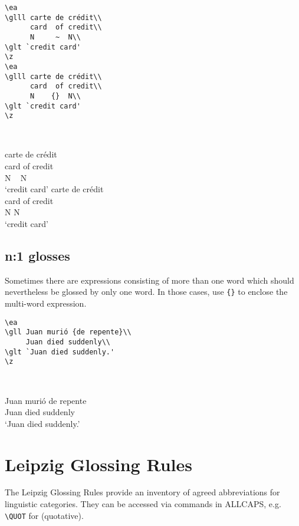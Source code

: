 \documentclass[output=paper]{langscibook}
\newcommand{\cmd}[1]{\texttt{\textbackslash#1}}
\begin{document}
\begin{minipage}[t]{.55\textwidth}
\begin{lstlisting}
\ea
\glll carte de crédit\\ 
      card  of credit\\
      N     ~  N\\
\glt `credit card'     
\z
\ea
\glll carte de crédit\\ 
      card  of credit\\
      N    {}  N\\
\glt `credit card'     
\z
 \end{lstlisting}
\end{minipage}~
\parbox[t]{.45\textwidth}{ 
\ea
\glll carte de crédit\\ 
      card  of credit\\
      N     ~  N\\
\glt `credit card'     
\z
\ea
\glll carte de crédit\\ 
      card  of credit\\
      N    {}  N\\
\glt `credit card'     
\z
}


\subsection{n:1 glosses}\label{sec:n1glosses}
Sometimes there are expressions consisting of more than one word which should nevertheless be glossed by only one word. In those cases, use \texttt{\{\}} to enclose the multi-word expression. 


\begin{minipage}[t]{.55\textwidth}
\begin{lstlisting}
\ea
\gll Juan murió {de repente}\\
     Juan died suddenly\\
\glt `Juan died suddenly.'     
\z
 \end{lstlisting}
\end{minipage}~
\parbox[t]{.45\textwidth}{ 
\ea
\gll Juan murió {de repente}\\
     Juan died suddenly\\
\glt `Juan died suddenly.'     
\z
}

\section{Leipzig Glossing Rules}
The Leipzig Glossing Rules provide an inventory of agreed abbreviations for linguistic categories. They can be accessed via commands in ALLCAPS, e.g. \cmd{QUOT} for {\QUOT} (quotative).
 
\end{document}
